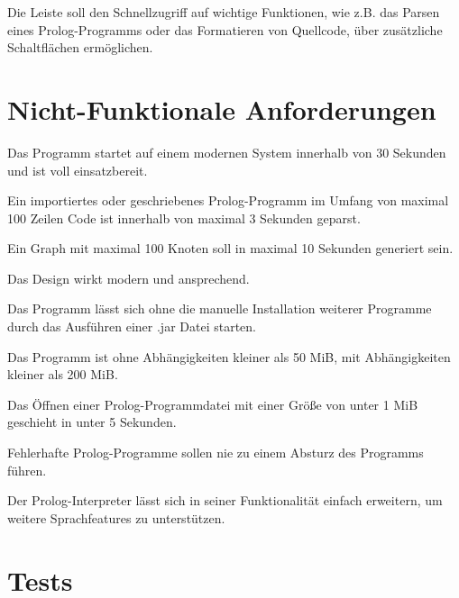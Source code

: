\documentclass[parskip=full,11pt,twoside]{scrartcl}
\begin{document}
Die Leiste soll den Schnellzugriff auf wichtige Funktionen, wie z.B. das Parsen eines Prolog-Programms oder das Formatieren von Quellcode, über zusätzliche Schaltflächen ermöglichen.

\section{Nicht-Funktionale Anforderungen}


Das Programm startet auf einem modernen System innerhalb von 30 Sekunden und ist voll einsatzbereit.


Ein importiertes oder geschriebenes Prolog-Programm im Umfang von maximal 100 Zeilen Code ist innerhalb von maximal 3 Sekunden geparst.


Ein Graph mit maximal 100 Knoten soll in maximal 10 Sekunden generiert sein.


Das Design wirkt modern und ansprechend.


Das Programm lässt sich ohne die manuelle Installation weiterer Programme durch das Ausführen einer .jar Datei starten.


Das Programm ist ohne Abhängigkeiten kleiner als 50 MiB, mit Abhängigkeiten kleiner als 200 MiB.


Das Öffnen einer Prolog-Programmdatei mit einer Größe von unter 1 MiB geschieht in unter 5 Sekunden.


Fehlerhafte Prolog-Programme sollen nie zu einem Absturz des Programms führen.


Der Prolog-Interpreter lässt sich in seiner Funktionalität einfach erweitern, um weitere Sprachfeatures zu unterstützen.

\section{Tests}
\end{document}

